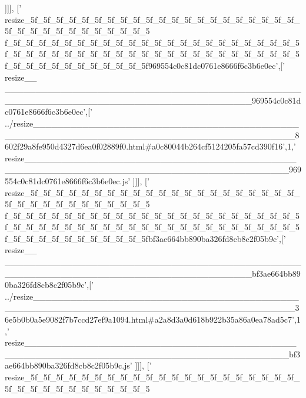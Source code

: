 \begin{DoxyCode}
      ]]],
  [\textcolor{stringliteral}{'
      resize\_5f\_5f\_5f\_5f\_5f\_5f\_5f\_5f\_5f\_5f\_5f\_5f\_5f\_5f\_5f\_5f\_5f\_5f\_5f\_5f\_5f\_5f\_5f\_5f\_5f\_5f\_5f\_5f\_5f\_5f\_5f\_5f\_5
      f\_5f\_5f\_5f\_5f\_5f\_5f\_5f\_5f\_5f\_5f\_5f\_5f\_5f\_5f\_5f\_5f\_5f\_5f\_5f\_5f\_5f\_5f\_5f\_5f\_5f\_5f\_5f\_5f\_5f\_5f\_5f\_5f\_5f\_5f\_5f\_5f\_5f\_5f\_5f\_5f\_5f\_5f\_5f\_5f\_5f\_5f\_5f\_5f\_5f\_5f\_5f\_5f\_5f\_5f\_5f\_5f\_5f969554c0c81dc0761e8666f6c3b6e0ec'},[\textcolor{stringliteral}{'
      resize\_\_
      \_\_\_\_\_\_\_\_\_\_\_\_\_\_\_\_\_\_\_\_\_\_\_\_\_\_\_\_\_\_\_\_\_\_\_\_\_\_\_\_\_\_\_\_\_\_\_\_\_\_\_\_\_\_\_\_\_\_\_\_\_\_\_\_\_\_\_\_\_\_\_\_\_\_\_\_\_\_\_\_\_\_\_\_\_\_\_\_969554c0c81dc0761e8666f6c3b6e0ec'},[\textcolor{stringliteral}{'
      ../resize\_\_\_\_\_\_\_\_\_\_\_\_\_\_\_\_\_\_\_\_\_\_\_\_\_\_\_\_\_\_\_\_\_\_\_\_\_\_\_\_\_\_\_\_\_\_\_\_\_\_\_\_\_\_\_\_\_\_\_\_\_\_\_\_\_\_\_\_\_\_\_\_\_\_\_\_\_\_\_\_\_\_\_\_\_\_\_\_\_\_8602f29a8fe950d4327d6ea0f02889f0.html#a0c80044b264cf5124205fa57cd390f16'},1,\textcolor{stringliteral}{'
      resize\_\_\_\_\_\_\_\_\_\_\_\_\_\_\_\_\_\_\_\_\_\_\_\_\_\_\_\_\_\_\_\_\_\_\_\_\_\_\_\_\_\_\_\_\_\_\_\_\_\_\_\_\_\_\_\_\_\_\_\_\_\_\_\_\_\_\_\_\_\_\_\_\_\_\_\_\_\_\_\_\_\_\_\_\_\_\_\_\_\_969554c0c81dc0761e8666f6c3b6e0ec.js'}
      ]]],
  [\textcolor{stringliteral}{'
      resize\_5f\_5f\_5f\_5f\_5f\_5f\_5f\_5f\_5f\_5f\_5f\_5f\_5f\_5f\_5f\_5f\_5f\_5f\_5f\_5f\_5f\_5f\_5f\_5f\_5f\_5f\_5f\_5f\_5f\_5f\_5f\_5f\_5
      f\_5f\_5f\_5f\_5f\_5f\_5f\_5f\_5f\_5f\_5f\_5f\_5f\_5f\_5f\_5f\_5f\_5f\_5f\_5f\_5f\_5f\_5f\_5f\_5f\_5f\_5f\_5f\_5f\_5f\_5f\_5f\_5f\_5f\_5f\_5f\_5f\_5f\_5f\_5f\_5f\_5f\_5f\_5f\_5f\_5f\_5f\_5f\_5f\_5f\_5f\_5f\_5f\_5f\_5f\_5f\_5f\_5fbf3ae664bb890ba326fd8cb8c2f05b9c'},[\textcolor{stringliteral}{'
      resize\_\_
      \_\_\_\_\_\_\_\_\_\_\_\_\_\_\_\_\_\_\_\_\_\_\_\_\_\_\_\_\_\_\_\_\_\_\_\_\_\_\_\_\_\_\_\_\_\_\_\_\_\_\_\_\_\_\_\_\_\_\_\_\_\_\_\_\_\_\_\_\_\_\_\_\_\_\_\_\_\_\_\_\_\_\_\_\_\_\_\_bf3ae664bb890ba326fd8cb8c2f05b9c'},[\textcolor{stringliteral}{'
      ../resize\_\_\_\_\_\_\_\_\_\_\_\_\_\_\_\_\_\_\_\_\_\_\_\_\_\_\_\_\_\_\_\_\_\_\_\_\_\_\_\_\_\_\_\_\_\_\_\_\_\_\_\_\_\_\_\_\_\_\_\_\_\_\_\_\_\_\_\_\_\_\_\_\_\_\_\_\_\_\_\_\_\_\_\_\_\_\_\_\_\_36e5b0b0a5e9082f7b7ccd27ef9a1094.html#a2a8d3a0d618b922b35a86a0ea78ad5c7'},1,\textcolor{stringliteral}{'
      resize\_\_\_\_\_\_\_\_\_\_\_\_\_\_\_\_\_\_\_\_\_\_\_\_\_\_\_\_\_\_\_\_\_\_\_\_\_\_\_\_\_\_\_\_\_\_\_\_\_\_\_\_\_\_\_\_\_\_\_\_\_\_\_\_\_\_\_\_\_\_\_\_\_\_\_\_\_\_\_\_\_\_\_\_\_\_\_\_\_\_bf3ae664bb890ba326fd8cb8c2f05b9c.js'}
      ]]],
  [\textcolor{stringliteral}{'
      resize\_5f\_5f\_5f\_5f\_5f\_5f\_5f\_5f\_5f\_5f\_5f\_5f\_5f\_5f\_5f\_5f\_5f\_5f\_5f\_5f\_5f\_5f\_5f\_5f\_5f\_5f\_5f\_5f\_5f\_5f\_5f\_5f\_5
}
\end{DoxyCode}
